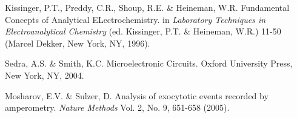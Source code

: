 \documentclass[twocolumn]{article}
\begin{document}
\begin{thebibliography}{9}

 Kissinger, P.T., Preddy, C.R., Shoup, R.E. \& Heineman, W.R. Fundamental Concepts of Analytical ELectrochemistry. in \emph{Laboratory Techniques in Electroanalytical Chemistry} (ed. Kissinger, P.T. \& Heineman, W.R.) 11-50 (Marcel Dekker, New York, NY, 1996).

 Sedra, A.S. \& Smith, K.C. Microelectronic Circuits. Oxford University Press, New York, NY, 2004.

 Mosharov, E.V. \& Sulzer, D. Analysis of exocytotic events recorded by amperometry. \emph{Nature Methods} Vol. 2, No. 9, 651-658 (2005).

\end{thebibliography}
\end{document}
